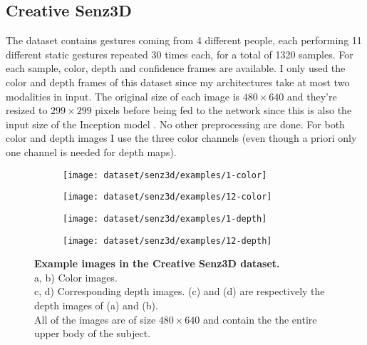 \subsection{Creative Senz3D}

The dataset contains gestures coming from 4 different people, each
performing 11 different static gestures repeated 30 times each,
for a total of 1320 samples.
For each sample, color, depth and confidence frames are available.
I only used the color and depth frames of this dataset since my
architectures take at most two modalities in input. The original
size of each image is $480 \times 640$ and they're resized to
$299 \times 299$ pixels before being fed to the network since this
is also the input size of the Inception model \cite{C. Szegedy 2017}.
No other preprocessing are done. For both color and depth images I use
the three color channels (even though a priori only one channel is needed
for depth maps).

\begin{figure}[H]
  \centering
  \hfill
  \begin{subfigure}{0.23\linewidth}
    \centering
    \texttt{[image: dataset/senz3d/examples/1-color]}
    \caption{}
  \end{subfigure}
  \hfill
  \begin{subfigure}{0.23\linewidth}
    \centering
    \texttt{[image: dataset/senz3d/examples/12-color]}
    \caption{}
  \end{subfigure}
  \hfill
  \begin{subfigure}{0.23\linewidth}
    \centering
    \texttt{[image: dataset/senz3d/examples/1-depth]}
    \caption{}
  \end{subfigure}
  \hfill
  \begin{subfigure}{0.23\linewidth}
    \centering
    \texttt{[image: dataset/senz3d/examples/12-depth]}
    \caption{}
  \end{subfigure}
  \caption{%
    \textbf{Example images in the Creative Senz3D dataset.}\\[0.1em]
    a, b) Color images.\\[0.1em]
    c, d) Corresponding depth images. (c) and (d) are respectively the
      depth images of (a) and (b).\\[0.1em]
    All of the images are of size $480 \times 640$ and contain the
      the entire upper body of the subject.}
  \label{fig:senz3d_exs}
\end{figure}

